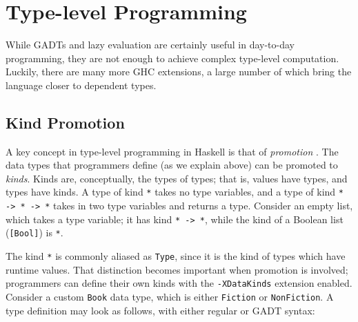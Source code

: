 \documentclass[12pt, a4paper, bibliography=totocnumbered]{scrreprt}
\newcommand{\inline}[1]{\lstinline[basicstyle=\ttfamily\footnotesize]{#1}}
\begin{document}



\section{Type-level Programming}

While GADTs and lazy evaluation are certainly useful in day-to-day programming, they are not enough to achieve complex type-level computation. Luckily, there are many more GHC extensions, a large number of which bring the language closer to dependent types.

\subsection{Kind Promotion}

A key concept in type-level programming in Haskell is that of \emph{promotion} \cite{givingpromotion}. The data types that programmers define (as we explain above) can be promoted to \emph{kinds}. Kinds are, conceptually, the types of types; that is, values have types, and types have kinds. A type of kind \inline{*} takes no type variables, and a type of kind \inline{* -> * -> *} takes in two type variables and returns a type. Consider an empty list, which takes a type variable; it has kind \inline{* -> *}, while the kind of a Boolean list (\inline{[Bool]}) is \inline{*}.

The kind \inline{*} is commonly aliased as \inline{Type}, since it is the kind of types which have runtime values. That distinction becomes important when promotion is involved; programmers can define their own kinds with the \inline{-XDataKinds} extension enabled. Consider a custom \inline{Book} data type, which is either \inline{Fiction} or \inline{NonFiction}. A type definition may look as follows, with either regular or GADT syntax:
\end{document}
